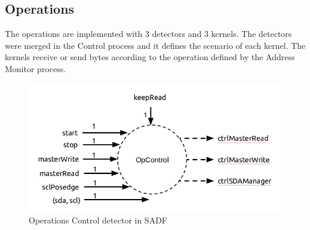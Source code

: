 \documentclass{article}
\begin{document}
\subsection{Operations}
The operations are implemented with 3 detectors and 3 kernels. The detectors were merged in the Control process and it defines the scenario of each kernel. The kernels receive or send bytes according to the operation defined by the Address Monitor process.
\begin{figure}
  \includegraphics[width=\linewidth]{img/block_control.png}
  \caption{Operations Control detector in SADF}
  \label{fig:block_control}
\end{figure}
\end{document}
